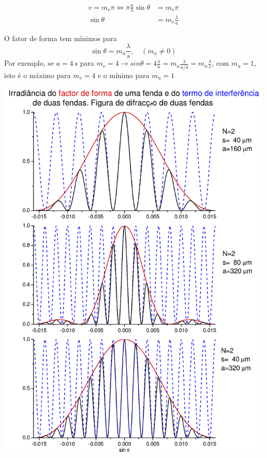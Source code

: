 \documentclass[a4paper,12pt]{article}
\begin{document}
\begin{align}\label{eq:49}
	v= m_v \pi \Leftrightarrow  \pi \frac{ a}{\lambda} \sin \theta  &= m_v \pi  \nonumber \\
	 \sin \theta  &= m_v  \frac{\lambda}{ a}
\end{align}

O fator de forma   tem mínimos  para  
\begin{equation}
	 \sin \theta  = m_u  \frac{\lambda}{s}, \quad (m_u \ne 0)
\end{equation}
Por exemplo, se $a=4\, s$ para $m_v=4 \to sin \theta  = 4 \frac{\lambda}{a} = m_u \frac{\lambda}{a/4} = m_u \frac{\lambda}{s} $, com $ m_u=1$, 
isto é o máximo para $m_v= 4$ e o mínimo para $m_u=1$ 


\begin{center}
\includegraphics{./figura7}\label{fig:7} \\[1cm]  %
\end{center}
\end{document}
